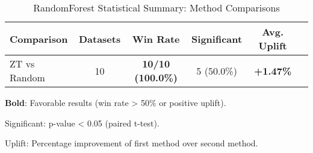\begin{table}[htbp]
\centering
\caption{RandomForest Statistical Summary: Method Comparisons}
\label{tab:randomforest_stats_summary}
\begin{tabular}{lccccc}
\toprule
Comparison & Datasets & Win Rate & Significant & Avg. Uplift \\
\midrule
ZT vs Random & 10 & \textbf{10/10 (100.0\%)} & 5 (50.0\%) & \textbf{+1.47\%} \\
\bottomrule
\end{tabular}
\begin{tablenotes}
\small
\item \textbf{Bold}: Favorable results (win rate > 50\% or positive uplift).
\item Significant: p-value < 0.05 (paired t-test).
\item Uplift: Percentage improvement of first method over second method.
\end{tablenotes}
\end{table}